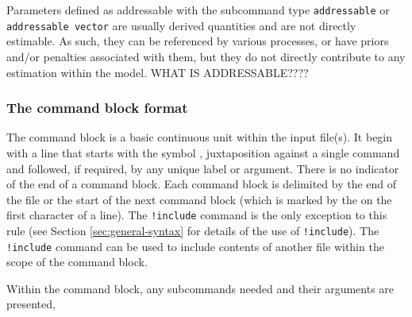 Parameters defined as addressable with the subcommand type \texttt{addressable} or \texttt{addressable vector} are usually derived quantities and are not directly estimable. As such, they can be referenced by various processes, or have priors and/or penalties associated with them, but they do not directly contribute to any estimation within the model. WHAT IS ADDRESSABLE????

\subsubsection{The command block format}\label{sec:command-block-format}

The command block is a basic continuous unit within the input file(s). It begin with a line that starts with the symbol \command{}, juxtaposition against a single command and followed, if required, by any unique label or argument. There is no indicator of the end of a command block. Each command block is delimited by the end of the file or the start of the next command block (which is marked by the \command{} on the first character of a line). The \texttt{!include} command is the only exception to this rule (see Section \ref{sec:general-syntax} for details of the use of \texttt{!include}). The \texttt{!include} command can be used to include contents of another file within the scope of the command block.

Within the command block, any subcommands needed and their arguments are presented,


